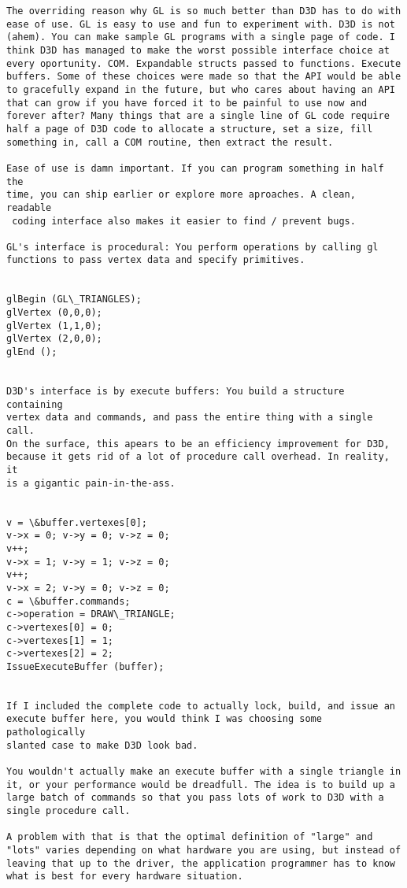 \begin{verbatim}
The overriding reason why GL is so much better than D3D has to do with
ease of use. GL is easy to use and fun to experiment with. D3D is not
(ahem). You can make sample GL programs with a single page of code. I
think D3D has managed to make the worst possible interface choice at 
every oportunity. COM. Expandable structs passed to functions. Execute
buffers. Some of these choices were made so that the API would be able
to gracefully expand in the future, but who cares about having an API
that can grow if you have forced it to be painful to use now and 
forever after? Many things that are a single line of GL code require 
half a page of D3D code to allocate a structure, set a size, fill 
something in, call a COM routine, then extract the result. 

Ease of use is damn important. If you can program something in half the
time, you can ship earlier or explore more aproaches. A clean, readable
 coding interface also makes it easier to find / prevent bugs. 

GL's interface is procedural: You perform operations by calling gl 
functions to pass vertex data and specify primitives. 


glBegin (GL\_TRIANGLES); 
glVertex (0,0,0); 
glVertex (1,1,0); 
glVertex (2,0,0); 
glEnd (); 


D3D's interface is by execute buffers: You build a structure containing 
vertex data and commands, and pass the entire thing with a single call. 
On the surface, this apears to be an efficiency improvement for D3D, 
because it gets rid of a lot of procedure call overhead. In reality, it
is a gigantic pain-in-the-ass. 


v = \&buffer.vertexes[0]; 
v->x = 0; v->y = 0; v->z = 0; 
v++; 
v->x = 1; v->y = 1; v->z = 0; 
v++; 
v->x = 2; v->y = 0; v->z = 0; 
c = \&buffer.commands; 
c->operation = DRAW\_TRIANGLE; 
c->vertexes[0] = 0; 
c->vertexes[1] = 1; 
c->vertexes[2] = 2; 
IssueExecuteBuffer (buffer); 


If I included the complete code to actually lock, build, and issue an 
execute buffer here, you would think I was choosing some pathologically 
slanted case to make D3D look bad. 

You wouldn't actually make an execute buffer with a single triangle in 
it, or your performance would be dreadfull. The idea is to build up a 
large batch of commands so that you pass lots of work to D3D with a 
single procedure call. 

A problem with that is that the optimal definition of "large" and 
"lots" varies depending on what hardware you are using, but instead of
leaving that up to the driver, the application programmer has to know 
what is best for every hardware situation. 


\end{verbatim}
